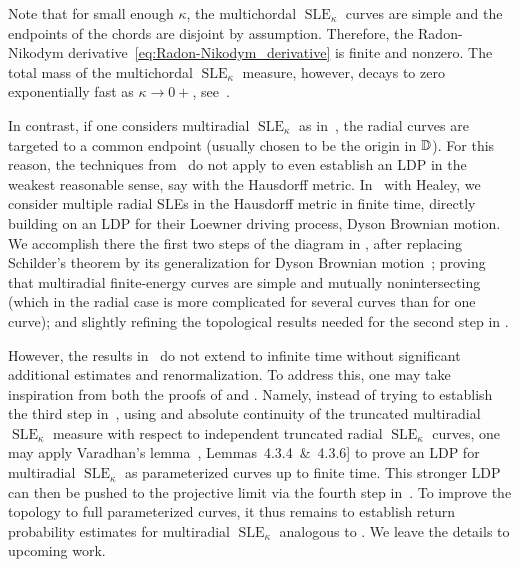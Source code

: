\documentclass[a4paper, 11pt]{article}
\theoremstyle{definition}
\numberwithin{equation}{section}
\numberwithin{figure}{section}
\newcommand{\SLE}[1][]{\operatorname{SLE}_{#1}}
\begin{document}
Note that for small enough $\kappa$, the multichordal $\SLE[\kappa]$ curves are simple 
and the endpoints of the chords are disjoint by assumption. 
Therefore, the Radon-Nikodym derivative~\eqref{eq:Radon-Nikodym_derivative} is finite and nonzero.
The total mass of the multichordal $\SLE[\kappa]$ measure, however, 
decays to zero exponentially fast as $\kappa\to 0+$, see~\cite[Equation~(1.10)~\&~Theorem~1.5]{Peltola-Wang:LDP}. 


In contrast, if one considers multiradial $\SLE[\kappa]$ as in~\cite{Healey-Lawler:N_sided_radial_SLE, AHP:Large_deviations_of_DBM_and_multiradial_SLE}, 
the radial curves are targeted to a common endpoint (usually chosen to be the origin in $\mathbb{D}$).
For this reason, the techniques from~\cite{Peltola-Wang:LDP} do not apply to even establish an LDP in 
the weakest reasonable sense, say with the Hausdorff metric.  
In~\cite[Theorem~1.8]{AHP:Large_deviations_of_DBM_and_multiradial_SLE} with Healey, 
we consider multiple radial SLEs in the Hausdorff metric in finite time, 
directly building on an LDP for their Loewner driving process, Dyson Brownian motion.
We accomplish there the first two steps of the diagram in ,
after replacing Schilder's theorem by its generalization for Dyson Brownian motion~\cite[Theorem~1.2]{AHP:Large_deviations_of_DBM_and_multiradial_SLE}; 
proving that multiradial finite-energy curves are simple and mutually nonintersecting~\cite[Theorem~1.9]{AHP:Large_deviations_of_DBM_and_multiradial_SLE}  
(which in the radial case is more complicated for several curves than for one curve); 
and slightly refining the topological results needed for the second step in  \cite[Section~3.4]{AHP:Large_deviations_of_DBM_and_multiradial_SLE}. 


However, the results in~\cite{AHP:Large_deviations_of_DBM_and_multiradial_SLE} 
do not extend to infinite time without significant additional estimates and renormalization. 
To address this, one may take inspiration from both the proofs of   and . 
Namely, instead of trying to establish the third step in~, using  and absolute continuity of 
the truncated multiradial $\SLE[\kappa]$ measure with respect to independent truncated radial $\SLE[\kappa]$ curves, 
one may apply Varadhan's lemma~\cite{Dembo-Zeitouni:Large_deviations_techniques_and_applications}, Lemmas~4.3.4~\&~4.3.6] 
to prove an LDP for multiradial $\SLE[\kappa]$ as parameterized curves up to finite time. 
This stronger LDP can then be pushed to the projective limit via the fourth step in~. 
To improve the topology to full parameterized curves, 
it thus remains to establish return probability estimates for multiradial $\SLE[\kappa]$ analogous to .
We leave the details to upcoming work.
\end{document}
